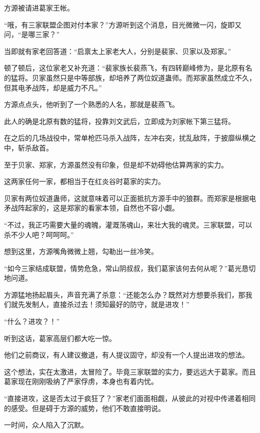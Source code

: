 
\begin{this_body}



方源被请进葛家王帐。

“哦，有三家联盟企图对付本家？”方源听到这个消息，目光微微一闪，旋即又问，“是哪三家？”

当即就有家老回答道：“启禀太上家老大人，分别是裴家、贝家以及郑家。”

顿了顿后，这位家老又补充道：“裴家族长裴燕飞，有四转巅峰修为，是北原有名的猛将。贝家虽然只是中等部族，却培养了两位奴道蛊师。而郑家虽然成立不久，但其电矛战阵，却是威力不凡。”

方源点点头，他听到了一个熟悉的人名，那就是裴燕飞。

此人的确是北原有数的猛将，投靠刘文武后，立即成为刘家帐下第三猛将。

在之后的几场战役中，常单枪匹马杀入战阵，左冲右突，扰乱敌阵，于披靡纵横之中，斩杀敌首。

至于贝家、郑家，方源虽然没有印象，但是却不妨碍他估算两家的实力。

这两家任何一家，都相当于在红炎谷时葛家的实力。

贝家有两位奴道蛊师，这就意味着可以正面抵抗方源手中的狼群。而郑家是根据电矛战阵起家的，这是郑家的看家本领，自然也不容小觑。

“不过，我正巧需要大量的魂魄，灌溉荡魂山，来壮大我的魂灵。三家联盟，可以杀不少人吧？呵呵呵。”

想到这里，方源嘴角微微上翘，勾勒出一丝冷笑。

“如今三家结成联盟，情势危急，常山阴叔叔，我们葛家该何去何从呢？”葛光恳切地问道。

方源猛地扬起眉头，声音充满了杀意：“还能怎么办？既然对方想要杀我们，那我们就先发制人，直接杀过去！须知最好的防守，就是进攻！”

“什么？进攻？！”

听到这话，葛家高层们都大吃一惊。

他们之前商议，有人建议撤退，有人提议固守，却没有一个人提出进攻的想法。

这个想法，实在太激进，太冒险了。毕竟三家联盟的实力，要远远大于葛家。而且葛家现在刚刚吸纳了严家俘虏，本身也有着内忧。

“直接进攻，这是否太过于疯狂了？”家老们面面相觑，从彼此的对视中传递着相同的感受。但是碍于方源的威势，他们不敢直接明说。

一时间，众人陷入了沉默。


\end{this_body}
